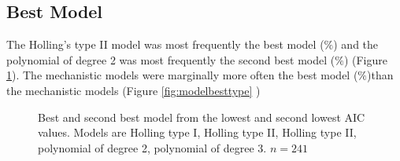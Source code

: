 \documentclass{article}
\begin{document}
\subsection{Best Model}
The Holling's type II model was most frequently the best model ($\%$) and the polynomial of degree 2 was most frequently the second best model ($\%$) (Figure \ref{fig:bestmodel}).
The mechanistic models were marginally more often the best model ($\%$)than the mechanistic models (Figure \ref{fig:modelbesttype} )
\begin{figure}[ht!]
\centering
{}
\caption{Best and second best model from the lowest and second lowest AIC values. Models are Holling type I, Holling type II, Holling type II, polynomial of degree 2, polynomial of degree 3. $n=241$}
\label{fig:bestmodel}
\end{figure}
\end{document}
